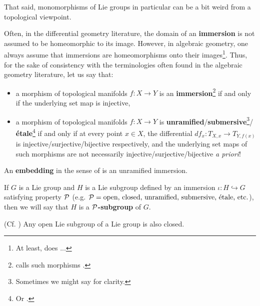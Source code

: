         That said, monomorphisms of Lie groups in particular can be a bit weird from a topological viewpoint.
        \begin{convention}[Immersions]
            Often, in the differential geometry literature, the domain of an \textbf{immersion} is not assumed to be homeomorphic to its image. However, in algebraic geometry, one always assume that immersions are homeomorphisms onto their images\footnote{At least, \cite{stacks} does ...}. Thus, for the sake of consistency with the terminologies often found in the algebraic geometry literature, let us say that:
            \begin{itemize}
                \item a morphism of topological manifolds $f: X \to Y$ is an \textbf{immersion}\footnote{\cite{lee_smooth_manifolds} calls such morphisms .} if and only if the underlying set map is injective,
                \item a morphism of topological manifolds $f: X \to Y$ is \textbf{unramified}/\textbf{submersive}\footnote{Sometimes we might say  for clarity.}/\textbf{\'etale}\footnote{Or .} if and only if at every point $x \in X$, the differential $df_x: T_{X, x} \to T_{Y, f(x)}$ is injective/surjective/bijective respectively, and the underlying set maps of such morphisms are not necessarily injective/surjective/bijective \textit{a priori}!
            \end{itemize}
            An \textbf{embedding} in the sense of \cite{lee_smooth_manifolds} is an unramified immersion.

            If $G$ is a Lie group and $H$ is a Lie subgroup defined by an immersion $\iota: H \hookrightarrow G$ satisfying property $\mathcal{P}$ (e.g. $\mathcal{P} = \text{open, closed, unramified, submersive, \'etale, etc.}$), then we will say that $H$ is a \textbf{$\mathcal{P}$-subgroup} of $G$.
        \end{convention}
        \begin{lemma} \label{lemma: embedded_lie_subgroups_are_closed}
            (Cf. \cite[Lemma 7.12]{lee_smooth_manifolds}) Any open Lie subgroup of a Lie group is also closed.
        \end{lemma}
